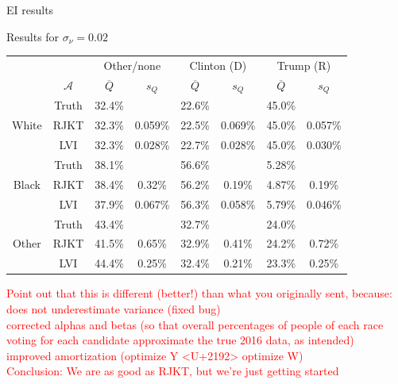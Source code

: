 \documentclass[
  ignorenonframetext,
]{beamer}
\begin{document}
\begin{frame}{EI results}
\protect\hypertarget{ei-results}{}

Results for \(\sigma_\nu=0.02\)

\begin{table}[htbp]
 \label{results0.3}
 \begin{tabular}{cc|cc|cc|cc}
       \multicolumn{2}{c}{}   & \multicolumn{2}{c}{Other/none} & \multicolumn{2}{c}{Clinton (D)} & \multicolumn{2}{c}{Trump (R)} \\
                   &$\mathcal{A}$       &  $\overline{Q}$         &   $s_Q$       &  $\overline{Q}$         &   $s_Q$     &  $\overline{Q}$         &   $s_Q$          \\
 \hline
\multirow{3}{*}{White} & Truth & 32.4\% &  & 22.6\% &  & 45.0\% &  \\ 
   & RJKT & 32.3\% & 0.059\% & 22.5\% & 0.069\% & 45.0\% & 0.057\% \\ 
   & LVI & 32.3\% & 0.028\% & 22.7\% & 0.028\% & 45.0\% & 0.030\% \\ 
   \hline 
  \multirow{3}{*}{Black} & Truth & 38.1\% &  & 56.6\% &  & 5.28\% &  \\ 
   & RJKT & 38.4\% & 0.32\% & 56.2\% & 0.19\% & 4.87\% & 0.19\% \\ 
   & LVI & 37.9\% & 0.067\% & 56.3\% & 0.058\% & 5.79\% & 0.046\% \\ 
   \hline 
  \multirow{3}{*}{Other} & Truth & 43.4\% &  & 32.7\% &  & 24.0\% &  \\ 
   & RJKT & 41.5\% & 0.65\% & 32.9\% & 0.41\% & 24.2\% & 0.72\% \\ 
   & LVI & 44.4\% & 0.25\% & 32.4\% & 0.21\% & 23.3\% & 0.25\% \\ 
   \hline 
 \end{tabular}
 \end{table}

\textcolor{red}{{\scriptsize Point out that this is different (better!) than what you originally sent, because:\\does not underestimate variance (fixed bug)\\corrected alphas and betas (so that overall percentages of people of each race voting for each candidate approximate the true 2016 data, as intended)\\improved amortization (optimize Y <U+2192> optimize W)\\Conclusion: We are as good as RJKT, but we’re just getting started}}

\end{frame}
\end{document}
